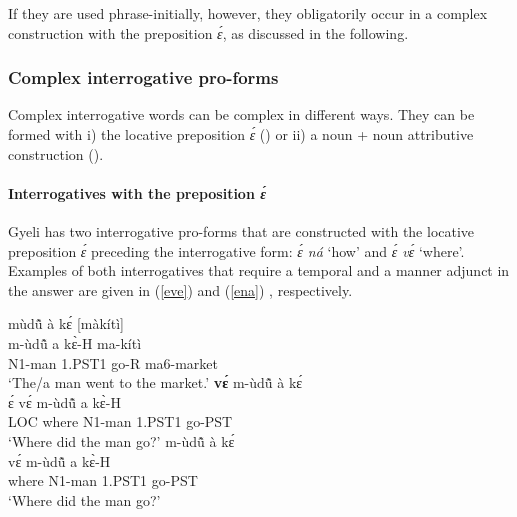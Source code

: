 \noindent If they are used phrase-initially, however, they obligatorily occur in a complex construction with the preposition {\itshape ɛ́}, as discussed in the following.


\subsubsection{Complex interrogative pro-forms}
\label{sec:INTERRC}

Complex interrogative words can be complex in different ways. They can be formed with i) the locative preposition {\itshape ɛ́} () or ii) a noun + noun attributive construction (). 


\paragraph{Interrogatives with the preposition {\itshape ɛ́}} 
Gyeli has two interrogative pro-forms that are constructed with the locative preposition {\itshape ɛ́} preceding the interrogative form: {\itshape ɛ́ ná} `how'  and {\itshape ɛ́ vɛ́} `where'. Examples of both  interrogatives that require a temporal and a manner adjunct in the answer are given in (\ref{eve}) and (\ref{ena}) , respectively.

\begin{exe}
\ex\label{eve}
\begin{xlist}
\ex \label{eve1}
  \glll mùdũ̂ à kɛ́ [màkítì] \\
    m-ùdũ̂ a kɛ̀-H ma-kítì \\
              N1-man 1.PST1 go-R ma6-market  \\
    \trans `The/a man went to the market.'
\ex\label{eve2}
  {\bfseries vɛ́} m-ùdũ̂ à kɛ́  \\
            ɛ́ vɛ́ m-ùdũ̂ a kɛ̀-H \\
             LOC where N1-man 1.PST1 go-PST \\
   \trans `Where did the man go?'
\ex\label{eve3}
  m-ùdũ̂ à kɛ́  \\
            vɛ́ m-ùdũ̂ a kɛ̀-H \\
             where N1-man 1.PST1 go-PST \\
   \trans `Where did the man go?'
\end {xlist}
\end {exe}

